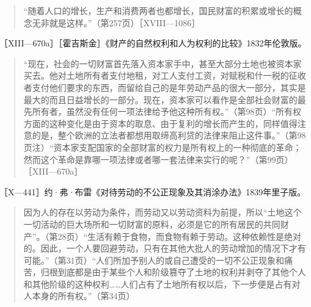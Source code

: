 \begin{quote}{“随着人口的增长，生产和消费两者也都增长，国民财富的积累或增长的概念无非就是这样。”（第257页）［XVIII—1086］}\end{quote}


［XIII—670a］［霍吉斯金］《财产的自然权利和人为权利的比较》1832年伦敦版。

\begin{quote}{“现在，社会的一切财富首先落入资本家手中，甚至大部分土地也被资本家买去。他对土地所有者支付地租，对工人支付工资，对赋税和什一税的征收者支付他们要求的东西，而留给自己的是年劳动产品的很大一部分，其实是最大的而且日益增长的一部分。现在，资本家可以看作是全部社会财富的最先所有者，虽然没有任何一项法律给予他这种所有权。”（第98页）“所有权方面的这种变化是由于资本的取息、由于复利的增长而产生的，同样值得注意的是，整个欧洲的立法者都想用取缔高利贷的法律来阻止这件事。”（第98页注）“资本家支配国家的全部财富的权力是所有权上的一种彻底的革命；然而这个革命是靠哪一项法律或者哪一套法律来实行的呢？”（第99页）［XIII—670a］}\end{quote}


［X—441］约·弗·布雷《对待劳动的不公正现象及其消涂办法》1839年里子版。

\begin{quote}{因为人的存在以劳动为条件，而劳动又以劳动资料为前提，所以“土地这个一切活动的巨大场所和一切财富的原料，必须是它的所有居民的共同财产”。（第28页）“生活有赖于食物，而食物有赖于劳动。这种依赖性是绝对的。因此，一个人要回避劳动，只有在其他大批人的劳动增加的情况下才有可能。”（第31页）“人们所加予别人的或自己遭受的一切不公正现象和痛苦，归根到底都是由于某些个人和阶级篡夺了土地的权利并剥夺了其他个人和其他阶级的这种权利……人们占有了土地所有权以后，下一步便是占有对人本身的所有权。”（第34页）}\end{quote}

